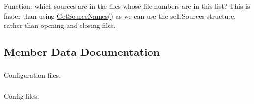 \-Function\-: which sources are in the files whose file numbers are in this list? \-This is faster than using \hyperlink{class_pipeline_1_1_pipeline_a6b4be370ebed0677a4f78bfd66b77097}{\-Get\-Source\-Names()} as we can use the self.\-Sources structure, rather than opening and closing files. 



\subsection{\-Member \-Data \-Documentation}
\hypertarget{class_pipeline_1_1_pipeline_a03b9a5afc3015bae8a2d92504236459e}{
\subsubsection[{\-B\-A\-T\-C\-H\-\_\-\-C\-O\-N\-F\-I\-G}]{}}\label{class_pipeline_1_1_pipeline_a03b9a5afc3015bae8a2d92504236459e}


\-Configuration files. 

\hypertarget{class_pipeline_1_1_pipeline_a1ceabfd647cd5a6ea0e02ac71f158c40}{
\subsubsection[{\-Config\-File}]{}}\label{class_pipeline_1_1_pipeline_a1ceabfd647cd5a6ea0e02ac71f158c40}


\-Config files. 

